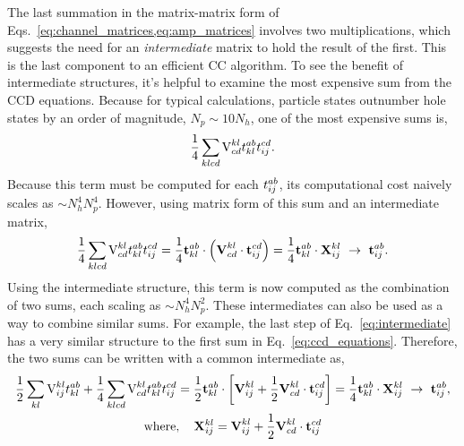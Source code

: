 \documentclass[thesis.tex]{subfiles}
\begin{document}
The last summation in the matrix-matrix form of Eqs.\ \eqref{eq:channel_matrices,eq:amp_matrices} involves two multiplications, which suggests the need for an \textit{intermediate} matrix to hold the result of the first.  This is the last component to an efficient CC algorithm.  To see the benefit of intermediate structures, it's helpful to examine the most expensive sum from the CCD equations.  Because for typical calculations, particle states outnumber hole states by an order of magnitude, $N_{p} \sim 10N_{h}$, one of the most expensive sums is,
\begin{equation}
  \frac{1}{4}\sum\limits_{\mathclap{klcd}}\vint{kl}{cd}\tamp{ab}{kl}\tamp{cd}{ij}.
\end{equation}
Because this term must be computed for each $t^{ab}_{ij}$, its computational cost naively scales as $\sim N_{h}^{4}N_{p}^{4}$.  However, using matrix form of this sum and an intermediate matrix,
\begin{equation} \label{eq:intermediate}
  \frac{1}{4}\sum\limits_{\mathclap{klcd}}\vint{kl}{cd}\tamp{ab}{kl}\tamp{cd}{ij} = \frac{1}{4}\btamp{ab}{kl}\cdot\left(\bvint{kl}{cd}\cdot\btamp{cd}{ij}\right) = \frac{1}{4}\btamp{ab}{kl}\cdot\bxint{kl}{ij}\ \rightarrow\ \btamp{ab}{ij}.
\end{equation}
Using the intermediate structure, this term is now computed as the combination of two sums, each scaling as $\sim N_{h}^{4}N_{p}^{2}$.  These intermediates can also be used as a way to combine similar sums.  For example, the last step of Eq.\ \ref{eq:intermediate} has a very similar structure to the first sum in Eq.\ \ref{eq:ccd_equations}.  Therefore, the two sums can be written with a common intermediate as,
\begin{gather}
  \frac{1}{2}\sum\limits_{\mathclap{kl}}\vint{kl}{ij}\tamp{ab}{kl} + \frac{1}{4}\sum\limits_{\mathclap{klcd}}\vint{kl}{cd}\tamp{ab}{kl}\tamp{cd}{ij} = \frac{1}{2}\btamp{ab}{kl}\cdot\left[ \bvint{kl}{ij} + \frac{1}{2}\bvint{kl}{cd}\cdot\btamp{cd}{ij} \right] = \frac{1}{4}\btamp{ab}{kl}\cdot\bxint{kl}{ij}\ \rightarrow\ \btamp{ab}{ij}, \notag \\
  \text{where},\hspace{10pt} \bxint{kl}{ij} = \bvint{kl}{ij} + \frac{1}{2}\bvint{kl}{cd}\cdot\btamp{cd}{ij}
\end{gather}
\end{document}
